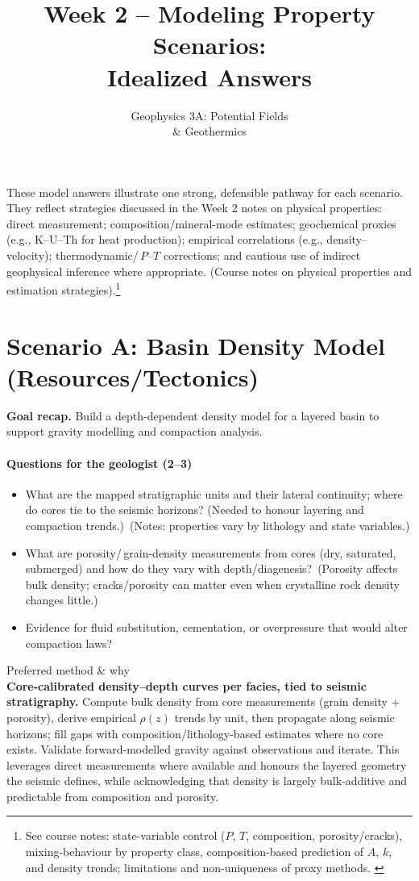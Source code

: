 \documentclass[11pt,a4paper]{article}
\title{Week 2 -- Modeling Property Scenarios:\\Idealized Answers}
\author{Geophysics 3A: Potential Fields \\ \& Geothermics}
\date{}
\begin{document}
\maketitle
These model answers illustrate one strong, defensible pathway for each scenario. They reflect strategies discussed in the Week 2 notes on physical properties: direct measurement; composition/mineral-mode estimates; geochemical proxies (e.g., K--U--Th for heat production); empirical correlations (e.g., density--velocity); thermodynamic/\,$P$--$T$ corrections; and cautious use of indirect geophysical inference where appropriate. (Course notes on physical properties and estimation strategies).\footnote{See course notes: state-variable control ($P$, $T$, composition, porosity/cracks), mixing-behaviour by property class, composition-based prediction of $A$, $k$, and density trends; limitations and non-uniqueness of proxy methods.
\label{notesref}}

\section*{Scenario A: Basin Density Model (Resources/Tectonics)}
\textbf{Goal recap.} Build a depth-dependent density model for a layered basin to support gravity modelling and compaction analysis.

\paragraph{Questions for the geologist (2--3)}
\begin{itemize}[leftmargin=*]
  \item What are the mapped stratigraphic units and their lateral continuity; where do cores tie to the seismic horizons? (Needed to honour layering and compaction trends.)~(Notes: properties vary by lithology and state variables.)\label{notesref}
  \item What are porosity/\,grain-density measurements from cores (dry, saturated, submerged) and how do they vary with depth/diagenesis?~(Porosity affects bulk density; cracks/porosity can matter even when crystalline rock density changes little.)\label{notesref}
  \item Evidence for fluid substitution, cementation, or overpressure that would alter compaction laws?
\end{itemize}

Preferred method \& why\\
\textbf{Core-calibrated density--depth curves per facies, tied to seismic stratigraphy.} Compute bulk density from core measurements (grain density + porosity), derive empirical $\rho(z)$ trends by unit, then propagate along seismic horizons; fill gaps with composition/lithology-based estimates where no core exists. Validate forward-modelled gravity against observations and iterate. This leverages direct measurements where available and honours the layered geometry the seismic defines, while acknowledging that density is largely bulk-additive and predictable from composition and porosity.\label{notesref}
\end{document}
